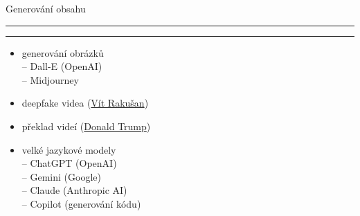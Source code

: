 \documentclass[aspectratio=43]{beamer}
\def\vs{\vspace{-2mm}}
\def\lend{\phantom{g}\vspace{1.5mm}\hrule\hrule}
\begin{document}
\begin{frame}{\vs Generování obsahu \lend}
\vspace{2mm}
\begin{itemize}
    \small
    \item generování obrázků\\ \vspace{2mm}
        -- Dall-E (OpenAI)\\ \vspace{2mm}
        -- Midjourney\\ \vspace{5mm}
    \item deepfake videa (\href{https://www.lidovky.cz/video-idnes.aspx?idvideo=V240128_091233_idnestv_vojt}{Vít Rakušan})\\ \vspace{5mm}
    \item překlad videí (\href{https://www.youtube.com/shorts/CcJroZAzVAw}{Donald Trump})\\ \vspace{5mm}
    \item velké jazykové modely\\ \vspace{2.5mm}
            -- ChatGPT (OpenAI)\\ \vspace{2.0mm}
            -- Gemini (Google)\\ \vspace{2.0mm}
            -- Claude (Anthropic AI)\\ \vspace{2.0mm}
        -- Copilot (generování kódu)
\end{itemize}
\end{frame}
\end{document}
